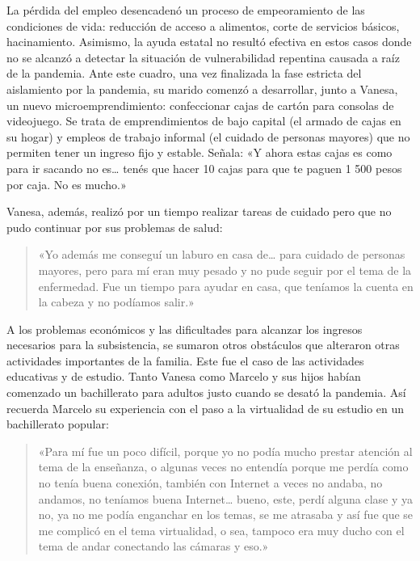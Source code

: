 La pérdida del empleo desencadenó un proceso de empeoramiento de las condiciones de vida: reducción de acceso a alimentos, corte de servicios básicos, hacinamiento. Asimismo, la ayuda estatal no resultó efectiva en estos casos donde no se alcanzó a detectar la situación de vulnerabilidad repentina causada a raíz de la pandemia. Ante este cuadro, una vez finalizada la fase estricta del aislamiento por la pandemia, su marido comenzó a desarrollar, junto a Vanesa, un nuevo microemprendimiento: confeccionar cajas de cartón para consolas de videojuego. Se trata de emprendimientos de bajo capital (el armado de cajas en su hogar) y empleos de trabajo informal (el cuidado de personas mayores) que no permiten tener un ingreso fijo y estable. Señala: «Y ahora estas cajas es como para ir sacando no es\ldots{} tenés que hacer 10 cajas para que te paguen 1 500 pesos por caja. No es mucho.»

Vanesa, además, realizó por un tiempo realizar tareas de cuidado pero que no pudo continuar por sus problemas de salud:

\begin{quote}
«Yo además me conseguí un laburo en casa de\ldots{} para cuidado de personas mayores, pero para mí eran muy pesado y no pude seguir por el tema de la enfermedad. Fue un tiempo para ayudar en casa, que teníamos la cuenta en la cabeza y no podíamos salir.»
\end{quote}

A los problemas económicos y las dificultades para alcanzar los ingresos necesarios para la subsistencia, se sumaron otros obstáculos que alteraron otras actividades importantes de la familia. Este fue el caso de las actividades educativas y de estudio. Tanto Vanesa como Marcelo y sus hijos habían comenzado un bachillerato para adultos justo cuando se desató la pandemia. Así recuerda Marcelo su experiencia con el paso a la virtualidad de su estudio en un bachillerato popular:

\begin{quote}
«Para mí fue un poco difícil, porque yo no podía mucho prestar atención al tema de la enseñanza, o algunas veces no entendía porque me perdía como no tenía buena conexión, también con Internet a veces no andaba, no andamos, no teníamos buena Internet\ldots{} bueno, este, perdí alguna clase y ya no, ya no me podía enganchar en los temas, se me atrasaba y así fue que se me complicó en el tema virtualidad, o sea, tampoco era muy ducho con el tema de andar conectando las cámaras y eso.»
\end{quote}


